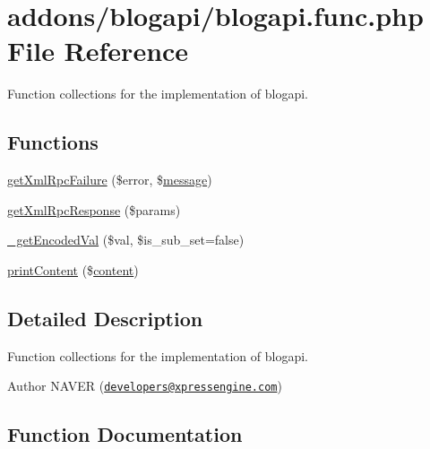 \hypertarget{blogapi_8func_8php}{}\section{addons/blogapi/blogapi.func.\+php File Reference}
\label{blogapi_8func_8php}


Function collections for the implementation of blogapi.  


\subsection*{Functions}
\begin{DoxyCompactItemize}
\item 
\hyperlink{blogapi_8func_8php_a7e46f8d2f9b3c3115d176926b68b6b09}{get\+Xml\+Rpc\+Failure} (\$error, \$\hyperlink{classmessage}{message})
\item 
\hyperlink{blogapi_8func_8php_a18b93e72ecaae5fdfcfe1f0f107238f6}{get\+Xml\+Rpc\+Response} (\$params)
\item 
\hyperlink{blogapi_8func_8php_a1557492ae9fc007747ea06aad32948a0}{\+\_\+get\+Encoded\+Val} (\$val, \$is\+\_\+sub\+\_\+set=false)
\item 
\hyperlink{blogapi_8func_8php_aee14687cb1bc033360baef8b634ab27e}{print\+Content} (\$\hyperlink{classcontent}{content})
\end{DoxyCompactItemize}


\subsection{Detailed Description}
Function collections for the implementation of blogapi. 

\begin{DoxyAuthor}{Author}
N\+A\+V\+ER (\href{mailto:developers@xpressengine.com}{\tt developers@xpressengine.\+com}) 
\end{DoxyAuthor}


\subsection{Function Documentation}
\hypertarget{blogapi_8func_8php_a1557492ae9fc007747ea06aad32948a0}{}\label{blogapi_8func_8php_a1557492ae9fc007747ea06aad32948a0} 
